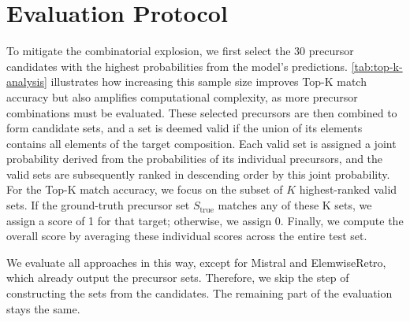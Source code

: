 \section{Evaluation Protocol}
\label{appendix:eval}

To mitigate the combinatorial explosion, we first select the $30$ precursor candidates with the highest probabilities from the model's predictions. \cref{tab:top-k-analysis} illustrates how increasing this sample size improves Top-K match accuracy but also amplifies computational complexity, as more precursor combinations must be evaluated. These selected precursors are then combined to form candidate sets, and a set is deemed valid if the union of its elements contains all elements of the target composition. Each valid set is assigned a joint probability derived from the probabilities of its individual precursors, and the valid sets are subsequently ranked in descending order by this joint probability. For the Top-K match accuracy, we focus on the subset of $K$ highest-ranked valid sets. If the ground-truth precursor set $S_{\text{true}}$ matches any of these K sets, we assign a score of 1 for that target; otherwise, we assign 0. Finally, we compute the overall score by averaging these individual scores across the entire test set.

We evaluate all approaches in this way, except for Mistral and ElemwiseRetro, which already output the precursor sets. Therefore, we skip the step of constructing the sets from the candidates. The remaining part of the evaluation stays the same.

